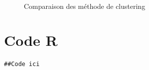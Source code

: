 \documentclass[11pt,a4paper]{article}
\begin{document}
\begin{figure}[t]
\centering
{}

\caption{Comparaison des méthode de clustering}
\label{fig:whatever}
\end{figure}




\section{Code R}
\lstset{language=R}
\begin{lstlisting}[breaklines]
##Code ici
\end{lstlisting}
\end{document}
